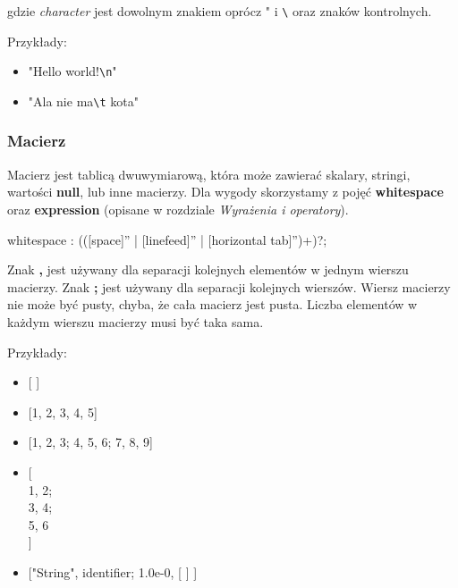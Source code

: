 \documentclass[12pt,a4paper]{article}
\begin{document}
gdzie \emph{character} jest dowolnym znakiem oprócz " i \verb+\+ oraz znaków kontrolnych.

\medskip
Przykłady:
\begin{itemize}

\item "Hello world!\verb+\n+"

\item "Ala nie ma\verb+\t+ kota"
\end{itemize}

\subsubsection{Macierz}
Macierz jest tablicą dwuwymiarową, która może zawierać skalary, stringi, wartości \textbf{null}, lub inne macierzy. Dla wygody skorzystamy z pojęć \textbf{whitespace} oraz \textbf{expression} (opisane w rozdziale \emph{Wyrażenia i operatory}).

\begin{rail}
  whitespace : (([space]'' | [linefeed]'' | [horizontal tab]'')+)?;
  
\end{rail}

\hspace*{-3cm}

\bigskip
Znak \textbf{,} jest używany dla separacji kolejnych elementów w jednym wierszu macierzy. Znak \textbf{;} jest używany dla separacji kolejnych wierszów. Wiersz macierzy nie może być pusty, chyba, że cała macierz jest pusta. Liczba elementów w każdym wierszu macierzy musi być taka sama.

\bigskip
Przykłady:

\begin{itemize}

\item {[ ]}

\item {[1, 2, 3, 4, 5]}

\item {[1, 2, 3; 4, 5, 6; 7, 8, 9]}

\item {[\\
        1, 2;\\
        3, 4;\\
        5, 6\\
       ]}
       
\item {["String", identifier; 1.0e-0, [ ] ]}

\end{itemize}
\end{document}
